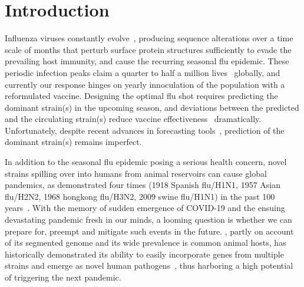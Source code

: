 \documentclass[onecolumn, compsoc,10pt]{IEEEtran}
\begin{document}












\vspace{10pt}
\section*{Introduction}

Influenza viruses constantly evolve~\cite{dos2016influenza},  producing  sequence alterations over a time scale of months  that  perturb surface protein structures sufficiently to evade the prevailing host immunity, and cause the  recurring seasonal flu epidemic. These periodic  infection peaks claim a quarter to half a million lives~\cite{huddleston2020integrating} globally,  and currently our response hinges on  yearly innoculation of the  population with a  reformulated  vaccine.  Designing the optimal flu shot requires predicting the dominant  strain(s)  in the upcoming season, and deviations between the predicted and the circulating strain(s)  reduce  vaccine effectiveness~\cite{tricco2013comparing} dramatically. Unfortunately,  despite  recent advances in forecasting tools~\cite{neher2014predicting,huddleston2020integrating}, prediction of the dominant strain(s) remains imperfect. 



In addition to  the seasonal flu epidemic posing a serious health concern, novel \infl strains spilling over into humans from animal reservoirs can cause global pandemics, as demonstrated four times (1918 Spanish flu/H1N1, 1957 Asian flu/H2N2, 1968 hongkong flu/H3N2, 2009 swine flu/H1N1) in the past 100 years~\cite{shao2017evolution}. With the memory of sudden emergence of   COVID-19 and the ensuing devastating pandemic fresh in our minds, a looming question  is whether we can prepare for, preempt and mitigate such events in the future.  \infl,  partly on account of its segmented genome and its wide prevalence is common animal hosts, has historically demonstrated its ability to easily incorporate genes from multiple strains and emerge as novel human pathogens~\cite{reid2003origin,vergara2014ns},  thus harboring  a high potential  of triggering the next  pandemic.
\end{document}
